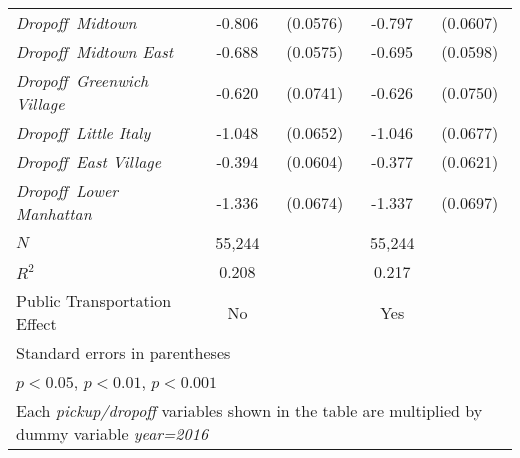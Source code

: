 \begin{table}[h]
{\begin{center}
\begin{tabular}{l*{2}{cc}}
\textit{Dropoff\, Midtown}&      -0.806\sym{***}&    (0.0576)&      -0.797\sym{***}&    (0.0607)\\
\textit{Dropoff\, Midtown East}&      -0.688\sym{***}&    (0.0575)&      -0.695\sym{***}&    (0.0598)\\
\textit{Dropoff\, Greenwich Village}&      -0.620\sym{***}&    (0.0741)&      -0.626\sym{***}&    (0.0750)\\
\textit{Dropoff\, Little Italy}&      -1.048\sym{***}&    (0.0652)&      -1.046\sym{***}&    (0.0677)\\
\textit{Dropoff\, East Village}&      -0.394\sym{***}&    (0.0604)&      -0.377\sym{***}&    (0.0621)\\
\textit{Dropoff\, Lower Manhattan}&      -1.336\sym{***}&    (0.0674)&      -1.337\sym{***}&    (0.0697)\\
\hline
\(N\)       &       55,244         &            &       55,244         &            \\
\(R^{2}\)   &       0.208         &            &       0.217 &            \\
Public Transportation Effect &     No               &            &               Yes      &            \\
\hline\hline
\multicolumn{5}{l}{\footnotesize Standard errors in parentheses}\\
\multicolumn{5}{l}{\footnotesize \sym{*} \(p<0.05\), \sym{**} \(p<0.01\), \sym{***} \(p<0.001\)}\\
\multicolumn{5}{l}{\footnotesize Each \textit{pickup/dropoff} variables shown in the table are multiplied by dummy variable \textit{year=2016}}\\
\end{tabular}
\end{center}
}


\end{table}

